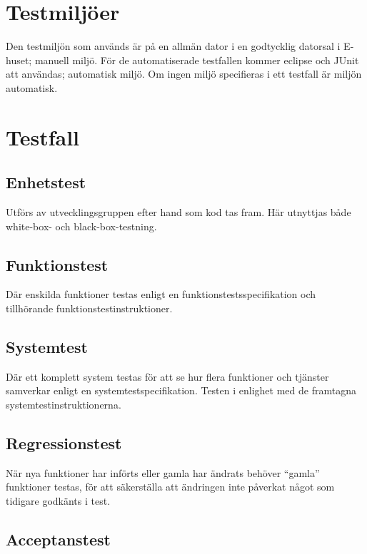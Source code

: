 \documentclass[a4paper]{article}
\begin{document}
\section{Testmiljöer}

Den testmiljön som används är på en allmän dator i en godtycklig datorsal i E-huset; 
manuell miljö. För de automatiserade testfallen kommer eclipse och JUnit att användas;
automatisk miljö. Om ingen miljö specifieras i ett testfall är miljön automatisk.

\section{Testfall}

\subsection{Enhetstest}

Utförs av utvecklingsgruppen efter hand som kod tas fram. Här utnyttjas både white-box- och black-box-testning.

\subsection{Funktionstest}

Där enskilda funktioner testas enligt en funktionstestsspecifikation och tillhörande funktionstestinstruktioner. 

\subsection{Systemtest}

Där ett komplett system testas för att se hur flera funktioner och tjänster samverkar enligt en systemtestspecifikation. Testen i enlighet med de framtagna systemtestinstruktionerna. 

\subsection{Regressionstest}

När nya funktioner har införts eller gamla har ändrats behöver ``gamla'' funktioner testas, för att säkerställa att ändringen inte påverkat något som tidigare godkänts i test.

\subsection{Acceptanstest}
\end{document}

